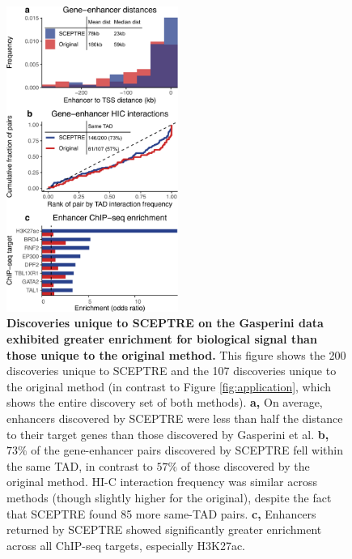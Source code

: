 \documentclass{article}
\begin{document}
 \clearpage
 \thispagestyle{empty}
\begin{figure}
    \centering
	\includegraphics[width = 0.5\textwidth]{FigureS3.pdf}
	\caption{\textbf{Discoveries unique to SCEPTRE on the Gasperini data exhibited greater enrichment for biological signal than those unique to the original method.} This figure shows the 200 discoveries unique to SCEPTRE and the 107 discoveries unique to the original method (in contrast to Figure \ref{fig:application}, which shows the entire discovery set of both methods). \textbf{a,} On average, enhancers discovered by SCEPTRE were less than half the distance to their target genes than those discovered by Gasperini et al. \textbf{b,} $73\%$ of the gene-enhancer pairs discovered by SCEPTRE fell within the same TAD, in contrast to $57\%$ of those discovered by the original method. HI-C interaction frequency was similar across methods (though slightly higher for the original), despite the fact that SCEPTRE found 85 more same-TAD pairs. \textbf{c,} Enhancers returned by SCEPTRE showed significantly greater enrichment across all ChIP-seq targets, especially H3K27ac.}
	\label{fig:symmetric-difference-gasp}
 \end{figure}
 
\end{document}
